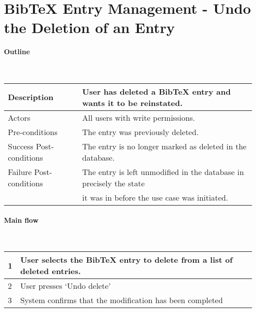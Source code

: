 \section*{BibTeX Entry Management - Undo the Deletion of an Entry} %

\paragraph*{Outline} \

\begin{tabular}{ | l | l | }
\hline
Description & User has deleted a BibTeX entry and wants it to be reinstated. \\ \hline
Actors & All users with write permissions. \\ \hline
Pre-conditions & The entry was previously deleted. \\ \hline
Success Post-conditions & The entry is no longer marked as deleted in the database. \\ \hline
Failure Post-conditions & The entry is left unmodified in the database in precisely the state \\
 & it was in before the use case was initiated. \\ \hline
\end{tabular}


\paragraph*{Main flow} \

\begin{tabular}{ | l | l | } \hline
1 & User selects the BibTeX entry to delete from a list of deleted entries. \\ \hline
2 & User presses `Undo delete' \\ \hline
3 & System confirms that the modification has been completed \\ \hline
\end{tabular}
